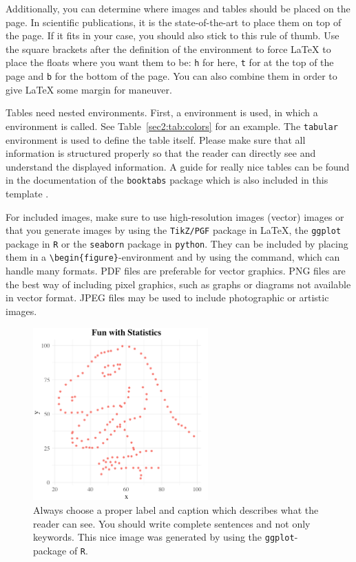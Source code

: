 \documentclass[
    language=german, %
    thesis=bachelor, %
    supervisor=postdoc, %
    multiauthor=false, %
    ]{settings/csssa-thesis}
\begin{document}
Additionally, you can determine where images and tables should be placed on the page. In scientific publications, it is the state-of-the-art to place them on top of the page. If it fits in your case, you should also stick to this rule of thumb. Use the square brackets after the definition of the environment to force \LaTeX{} to place the floats where you want them to be: \texttt{h} for here, \texttt{t} for at the top of the page and \texttt{b} for the bottom of the page. You can also combine them in order to give \LaTeX{} some margin for maneuver.

Tables need nested environments. First, a  environment is used, in which a  environment is called. See Table~\ref{sec2:tab:colors} for an example. The \texttt{tabular} environment is used to define the table itself. Please make sure that all information is structured properly so that the reader can directly see and understand the displayed information. A guide for really nice tables can be found in the documentation of the \texttt{booktabs} package which is also included in this template \citep{Fear2020booktabs}.


For included images, make sure to use high-resolution images (vector) images or that you generate images by using the \texttt{TikZ/PGF} package in \LaTeX, the \texttt{ggplot} package in \texttt{R} or the \texttt{seaborn} package in \texttt{python}. They can be included by placing them in a \verb|\begin{figure}|-environment and by using the  command, which can handle many formats. PDF files are preferable for vector graphics.  PNG files are the best way of including pixel graphics, such as graphs or diagrams not available in vector format.  JPEG files may be used to include photographic or artistic images.

\begin{figure}[ht]
    \centering
    \includegraphics[width=0.6\textwidth]{figures/dummy_figure.png}
    \caption{Always choose a proper label and caption which describes what the reader can see. You should write complete sentences and not only keywords. This nice image was generated by using the \texttt{ggplot}-package of \texttt{R}.}\label{fig:my_label}
\end{figure}
\end{document}
